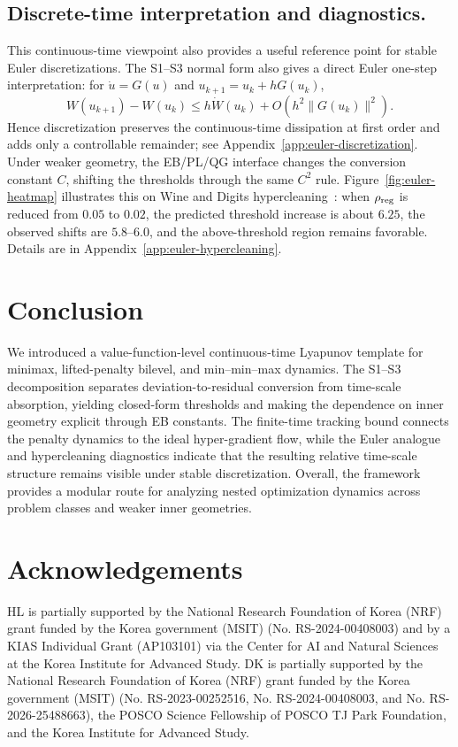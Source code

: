 \documentclass{article}
\newcommand{\1}{\mathbf{1}}
\begin{document}
\subsection{Discrete-time interpretation and diagnostics.}
This continuous-time viewpoint also provides a useful reference point for stable Euler discretizations. The S1--S3 normal form also gives a direct Euler one-step interpretation:
for $\dot u=G(u)$ and $u_{k+1}=u_k+hG(u_k)$,
\[
W(u_{k+1})-W(u_k)
\le h\dot W(u_k)+O(h^2\|G(u_k)\|^2).
\]
Hence discretization preserves the continuous-time dissipation at first order and adds only a controllable remainder; see Appendix~\ref{app:euler-discretization}. Under weaker geometry, the EB/PL/QG interface changes the conversion constant $C$, shifting the thresholds through the same $C^2$ rule. Figure~\ref{fig:euler-heatmap} illustrates this on Wine and Digits hypercleaning~\cite{franceschi2018bilevel,shaban2019truncated}: when $\rho_{\rm reg}$ is reduced from $0.05$ to $0.02$, the predicted threshold increase is about $6.25$, the observed shifts are $5.8$--$6.0$, and the above-threshold region remains favorable. Details are in Appendix~\ref{app:euler-hypercleaning}.


\section{Conclusion}
We introduced a value-function-level continuous-time Lyapunov template for minimax, lifted-penalty bilevel, and min--min--max dynamics. The S1--S3 decomposition separates deviation-to-residual conversion from time-scale absorption, yielding closed-form thresholds and making the dependence on inner geometry explicit through EB constants. The finite-time tracking bound connects the penalty dynamics to the ideal hyper-gradient flow, while the Euler analogue and hypercleaning diagnostics indicate that the resulting relative time-scale structure remains visible under stable discretization. Overall, the framework provides a modular route for analyzing nested optimization dynamics across problem classes and weaker inner geometries.




\section*{Acknowledgements}
HL is partially supported by the National Research Foundation of Korea (NRF) grant funded by the Korea government (MSIT) (No. RS-2024-00408003) and by a KIAS Individual Grant (AP103101) via the Center for AI and Natural Sciences at the Korea Institute for Advanced Study. DK is partially supported by the National Research Foundation of Korea (NRF) grant funded by the Korea government (MSIT) (No. RS-2023-00252516, No. RS-2024-00408003, and No. RS-2026-25488663), the POSCO Science Fellowship of POSCO TJ Park Foundation, and the Korea Institute for Advanced Study.
\end{document}
